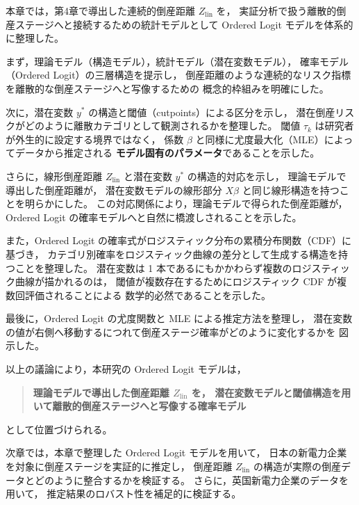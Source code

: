 本章では，第4章で導出した連続的倒産距離 $Z_{\text{lin}}$ を，
実証分析で扱う離散的倒産ステージへと接続するための統計モデルとして
Ordered Logit モデルを体系的に整理した。

まず，理論モデル（構造モデル），統計モデル（潜在変数モデル），
確率モデル（Ordered Logit）の三層構造を提示し，
倒産距離のような連続的なリスク指標を離散的な倒産ステージへと写像するための
概念的枠組みを明確にした。

次に，潜在変数 $y^*$ の構造と閾値（cutpoints）による区分を示し，
潜在倒産リスクがどのように離散カテゴリとして観測されるかを整理した。
閾値 $\tau_k$ は研究者が外生的に設定する境界ではなく，
係数 $\beta$ と同様に尤度最大化（MLE）によってデータから推定される
\textbf{モデル固有のパラメータ}であることを示した。

さらに，線形倒産距離 $Z_{\text{lin}}$ と潜在変数 $y^*$ の構造的対応を示し，
理論モデルで導出した倒産距離が，
潜在変数モデルの線形部分 $X\beta$ と同じ線形構造を持つことを明らかにした。
この対応関係により，理論モデルで得られた倒産距離が，
Ordered Logit の確率モデルへと自然に橋渡しされることを示した。

また，Ordered Logit の確率式がロジスティック分布の累積分布関数（CDF）に基づき，
カテゴリ別確率をロジスティック曲線の差分として生成する構造を持つことを整理した。
潜在変数は 1 本であるにもかかわらず複数のロジスティック曲線が描かれるのは，
閾値が複数存在するためにロジスティック CDF が複数回評価されることによる
数学的必然であることを示した。

最後に，Ordered Logit の尤度関数と MLE による推定方法を整理し，
潜在変数の値が右側へ移動するにつれて倒産ステージ確率がどのように変化するかを
図示した。

以上の議論により，本研究の Ordered Logit モデルは，

\begin{quote}
\textbf{
理論モデルで導出した倒産距離 $Z_{\text{lin}}$ を，
潜在変数モデルと閾値構造を用いて離散的倒産ステージへと写像する確率モデル
}
\end{quote}

として位置づけられる。

次章では，本章で整理した Ordered Logit モデルを用いて，
日本の新電力企業を対象に倒産ステージを実証的に推定し，
倒産距離 $Z_{\text{lin}}$ の構造が実際の倒産データとどのように整合するかを検証する。
さらに，英国新電力企業のデータを用いて，
推定結果のロバスト性を補足的に検証する。
